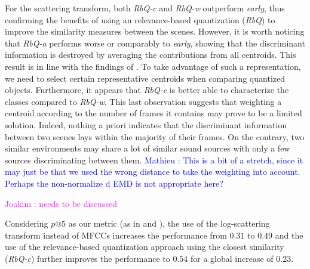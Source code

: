 \documentclass[smallextended]{svjour3}
\newcommand{\ja}[1]{\textcolor{magenta}{Joakim : #1}}
\newcommand{\ml}[1]{\textcolor{blue}{ Mathieu : #1}}
\begin{document}
For the scattering transform, both \emph{RbQ-c} and \emph{RbQ-w} outperform \emph{early}, thus confirming the benefits of using an relevance-based quantization (\emph{RbQ}) to improve the similarity measures between the scenes. However, it is worth noticing that \emph{RbQ-a} performs worse or comparably to \emph{early}, showing that the discriminant information is destroyed by averaging the contributions from all centroids. This result is in line with the findings of \cite{lagrange:hal-01082501}. To take advantage of such a representation, we need to select certain representative centroids when comparing quantized objects. Furthermore, it appears that \emph{RbQ-c} is better able to characterize the classes compared to \emph{RbQ-w}. This last observation suggests that weighting a centroid according to the number of frames it contains may prove to be a limited solution. Indeed, nothing a priori indicates that the discriminant information between two scenes lays within the majority of their frames. On the contrary, two similar environments may share a lot of similar sound sources with only a few sources discriminating between them. \ml{This is a bit of a stretch, since it may just be that we used the wrong distance to take the weighting into account. Perhaps the non-normalize d EMD is not appropriate here?}

\ja{needs to be discussed}

Considering $p@5$ as our metric (as in \cite{aucouturier2007bag} and \cite{lagrange:hal-01082501}), the use of the log-scattering transform instead of MFCCs increases the performance from $0.31$ to $0.49$ and the use of the relevance-based quantization approach using the closest similarity (\emph{RbQ-c}) further improves the performance to $0.54$ for a global increase of $0.23$.


\end{document}
